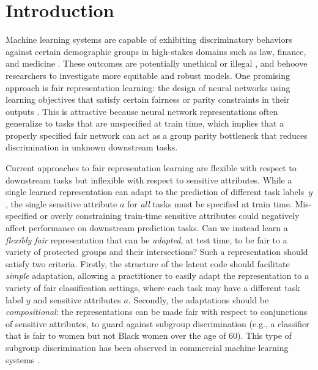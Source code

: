 \section{Introduction}
Machine learning systems are capable of exhibiting discriminatory behaviors against certain demographic groups in high-stakes domains such as law, finance, and medicine \citep{kirchner2016machine,aleo2008foreclosure,kim2015sex}.
These outcomes are potentially unethical or illegal \citep{barocas2014datas,hellman2017indirect}, and behoove researchers to investigate more equitable and robust models.
One promising approach is fair representation learning: the design of neural networks using learning objectives that satisfy certain fairness or parity constraints in their outputs \citep{zemel2013learning,louizos2015variational,edwards2015censoring,madras2018learning}.
This is attractive because neural network representations often generalize to tasks that are unspecified at train time, which implies that a properly specified fair network can act as a group parity bottleneck that reduces discrimination in unknown downstream tasks.

Current approaches to fair representation learning are flexible with respect to downstream tasks but inflexible with respect to sensitive attributes.
While a single learned representation can adapt to the prediction of different task labels~$y$, the single sensitive attribute $a$ for \emph{all} tasks must be specified at train time.
Mis-specified or overly constraining train-time sensitive attributes could negatively affect performance on downstream prediction tasks.
Can we instead learn a \textit{flexibly fair} representation that can be \emph{adapted}, at test time, to be fair to a variety of protected groups and their intersections?
Such a representation should satisfy two criteria.
Firstly, the structure of the latent code should facilitate \textit{simple} adaptation, allowing a practitioner to easily adapt the representation to a variety of fair classification settings, where each task may have a different task label $y$ and sensitive attributes $a$.
Secondly, the adaptations should be \textit{compositional}: the representations can be made fair with respect to conjunctions of sensitive attributes, to guard against subgroup discrimination (e.g., a classifier that is fair to women but not Black women over the age of 60).
This type of subgroup discrimination has been observed in commercial machine learning systems \citep{buolamwini2018gender}.

